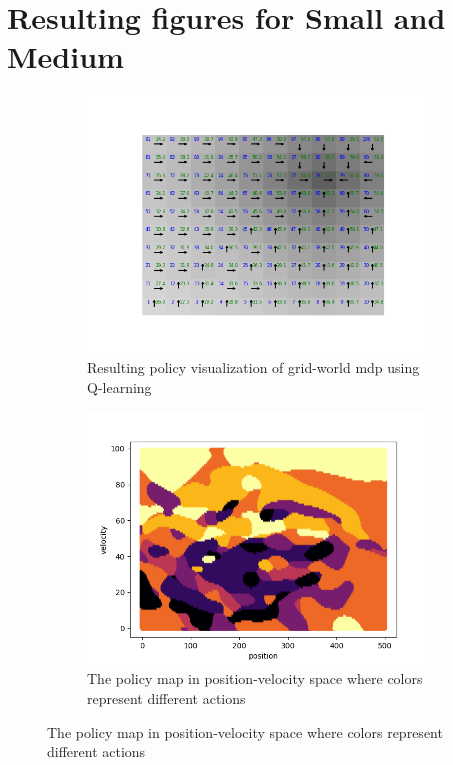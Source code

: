 \documentclass[12pt]{article}
\begin{document}
\section{Resulting figures for Small and Medium}
\begin{figure}[h]
\centering
\begin{subfigure}{.5\textwidth}
  \centering
  \includegraphics[width=1.2\linewidth]{grid_mdp}
  \caption{Resulting policy visualization of grid-world mdp using Q-learning}
  \label{fig:sub1}
\end{subfigure}%
\begin{subfigure}{.5\textwidth}
  \centering
  \includegraphics[width=1.2\linewidth]{small}
  \caption{The policy map in position-velocity space where colors represent different actions}
  \label{fig:sub2}
\end{subfigure}
\label{fig:test}
\end{figure}
\appendix
\end{document}
